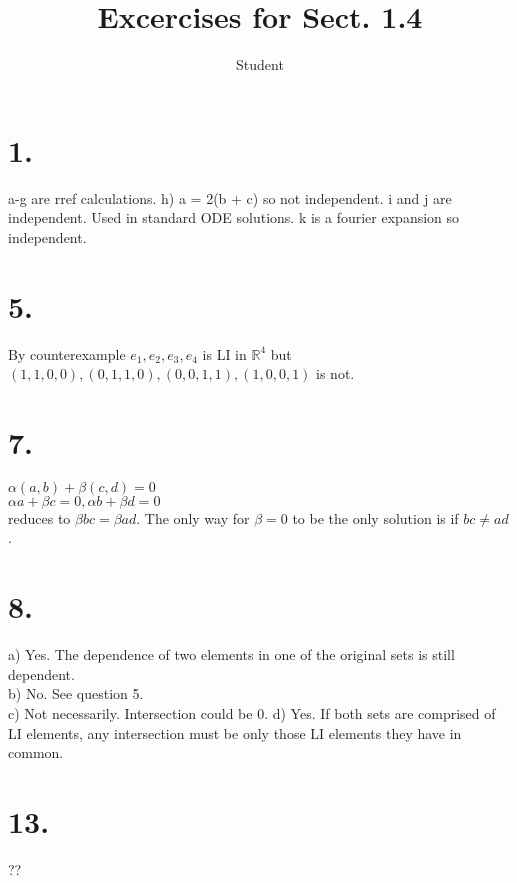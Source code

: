 \documentclass{article}
\title{Excercises for Sect. 1.4}
\author{Student}
\begin{document}
\maketitle
\section*{1.}
a-g are rref calculations.
h) a = 2(b + c) so not independent.
i and j are independent.  Used in standard ODE solutions.
k is a fourier expansion so independent.
\section*{5.}
By counterexample ${e_1,e_2,e_3,e_4}$ is LI in $\mathbb{R}^4$ but ${(1,1,0,0),(0,1,1,0),(0,0,1,1),(1,0,0,1)}$ is not.
\section*{7.}
$\alpha(a,b)+\beta(c,d)=0$\\
$\alpha a + \beta c = 0, \alpha b + \beta d = 0$\\
reduces to $\beta bc = \beta ad$. The only way for $\beta = 0$ to be the only solution is if $bc \ne ad$.
\section*{8.}
a) Yes. The dependence of two elements in one of the original sets is still dependent.\\
b) No. See question 5.\\
c) Not necessarily. Intersection could be 0.
d) Yes. If both sets are comprised of LI elements, any intersection must be only those LI elements they have in common.
\section*{13.}
??
\end{document}
